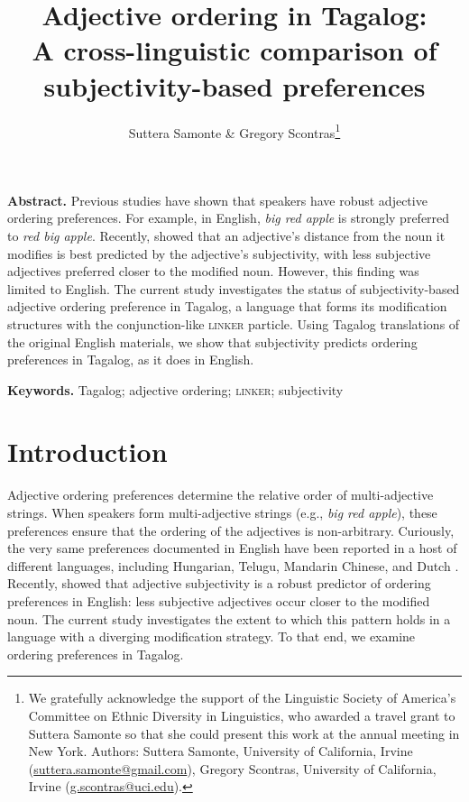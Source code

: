 \documentclass[12pt,letterpaper]{article}
\title{
	Adjective ordering in Tagalog:\\
	A cross-linguistic comparison of subjectivity-based preferences
}
\author{Suttera Samonte \& Gregory Scontras\footnote{We gratefully acknowledge the support of the Linguistic Society of America's Committee on Ethnic Diversity in Linguistics, who awarded a travel grant to Suttera Samonte so that she could present this work at the annual meeting in New York. %
		Authors: Suttera Samonte, University of California, Irvine (\href{mailto:suttera.samonte@gmail.com}{suttera.samonte@gmail.com}),
		Gregory Scontras, University of California, Irvine (\href{mailto:g.scontras@uci.edu}{g.scontras@uci.edu}).}}
\renewenvironment{abstract}{%
\noindent\begin{minipage}{1\textwidth}
\setlength{\leftskip}{0.4in}
\setlength{\rightskip}{0.4in}
\textbf{Abstract.}}
{\end{minipage}}
\newenvironment{keywords}{%
\vspace{.5em}
\noindent\begin{minipage}{1\textwidth}
\setlength{\leftskip}{0.4in}
\setlength{\rightskip}{0.4in}
\textbf{Keywords.}}
{\end{minipage}}
\begin{document}
 

\setlength{\Extopsep}{6pt}
\setlength{\Exlabelsep}{9pt}		%
 
\maketitle

\begin{abstract}
	Previous studies have shown that speakers have robust adjective ordering preferences. For example, in English, \emph{big red apple} is strongly preferred to \emph{red big apple}. Recently, \cite{scontrasetal2017adjectives}
	showed that an adjective's distance from the noun it modifies is best predicted by the adjective's subjectivity, with less subjective adjectives preferred closer to the modified noun. However, this finding was limited to English. The current study investigates the status of subjectivity-based adjective ordering preference in Tagalog, a language that forms its modification structures with the conjunction-like \textsc{linker} particle. Using Tagalog translations of the original English materials, we show that subjectivity predicts ordering preferences in Tagalog, as it does in English.
\end{abstract}

\begin{keywords}
	Tagalog; adjective ordering; \textsc{linker}; subjectivity
\end{keywords}

\section{Introduction}

Adjective ordering preferences determine the relative order of multi-adjective strings. When speakers form multi-adjective strings (e.g., \emph{big red apple}), these preferences ensure that the ordering of the adjectives is non-arbitrary.  Curiously, the very same preferences documented in English have been reported in a host of different languages, including Hungarian, Telugu, Mandarin Chinese, and Dutch \citep[e.g.,][]{Martin1969competence,hetzron1978,dixon1982,sproatshih1991}.  
Recently, \cite{scontrasetal2017adjectives} showed that adjective subjectivity is a robust predictor of ordering preferences in English: less subjective adjectives occur closer to the modified noun. The current study investigates the extent to which this pattern holds in a language with a diverging modification strategy. To that end, we examine ordering preferences in Tagalog. 
\end{document}
